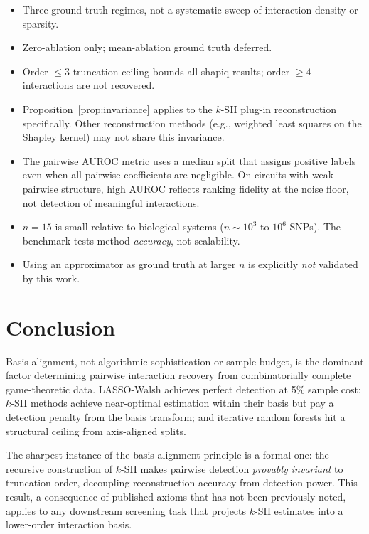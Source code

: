 \documentclass[11pt]{article}
\begin{document}
\begin{itemize}
\item Three ground-truth regimes, not a systematic sweep of
      interaction density or sparsity.
\item Zero-ablation only; mean-ablation ground truth deferred.
\item Order $\leq 3$ truncation ceiling bounds all shapiq results;
      order $\geq 4$ interactions are not recovered.
\item Proposition~\ref{prop:invariance} applies to the $k$-SII
      plug-in reconstruction specifically. Other reconstruction
      methods (e.g., weighted least squares on the Shapley kernel)
      may not share this invariance.
\item The pairwise AUROC metric uses a median split that assigns
      positive labels even when all pairwise coefficients are
      negligible. On circuits with weak pairwise structure, high
      AUROC reflects ranking fidelity at the noise floor, not
      detection of meaningful interactions.
\item $n = 15$ is small relative to biological systems
      ($n \sim 10^3$ to $10^6$ SNPs). The benchmark tests method
      \emph{accuracy}, not scalability.
\item Using an approximator as ground truth at larger $n$ is
      explicitly \emph{not} validated by this work.
\end{itemize}


\section{Conclusion}
\label{sec:conclusion}

Basis alignment, not algorithmic sophistication or sample budget,
is the dominant factor determining pairwise interaction recovery
from combinatorially complete game-theoretic data. LASSO-Walsh
achieves perfect detection at 5\% sample cost; $k$-SII methods
achieve near-optimal estimation within their basis but pay a
detection penalty from the basis transform; and iterative random
forests hit a structural ceiling from axis-aligned splits.

The sharpest instance of the basis-alignment principle is a formal
one: the recursive construction of $k$-SII makes pairwise detection
\emph{provably invariant} to truncation order, decoupling
reconstruction accuracy from detection power. This result, a
consequence of published axioms that has not been previously noted,
applies to any downstream screening task that projects $k$-SII
estimates into a lower-order interaction basis.
\end{document}
